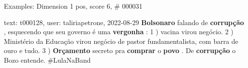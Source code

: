 \begin{frame}{Examples: Dimension 1 pos, score 6, \# 000031}
\footnotesize
\begin{exampleblock}{text: t000128, user: taliriapetrone, 2022-08-29}
\textbf{Bolsonaro} falando de \textbf{corrupção} , esquecendo que seu governo é 
uma \textbf{vergonha} : 1 ) vacina virou negócio. 2 ) Ministério da Educação 
virou negócio de pastor fundamentalista, com barra de ouro e tudo. 3 ) 
\textbf{Orçamento} secreto pra \textbf{comprar} o \textbf{povo} . De 
\textbf{corrupção} o Bozo entende. \#LulaNaBand 
\end{exampleblock}
\end{frame}
